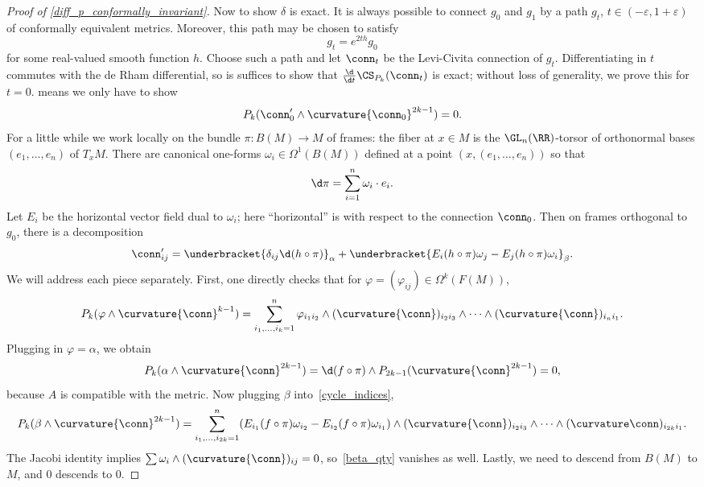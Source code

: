 \begin{proof}[Proof of \cref{diff_p_conformally_invariant}]
Now to show $\delta$ is exact. It is always possible to connect $g_0$ and $g_1$ by a path $g_t$,
$t\in(-\varepsilon, 1+\varepsilon)$ of conformally equivalent metrics. Moreover, this path may be chosen to satisfy
\[g_t = e^{2th}g_0\]
for some real-valued smooth function $h$. Choose such a path and let $\conn_t$ be the Levi-Civita connection of
$g_t$.  Differentiating in $t$ commutes with the de Rham differential, so is suffices to show that $\frac{\d}{\d
t}\CS_{P_k}(\conn_t)$ is exact; without loss of generality, we prove this for $t = 0$.
 means we only have to show
\begin{equation}
	P_k(\conn_0'\wedge \curvature{\conn_0}^{2k-1}) = 0.
\end{equation}
For a little while we work locally on the bundle $\pi\colon B(M)\to M$ of frames: the fiber at $x\in M$ is the
$\GL_n(\RR)$-torsor of orthonormal bases $(e_1, \dotsc, e_n)$ of $T_xM$. There are canonical one-forms
$\omega_i\in\Omega^1(B(M))$ defined at a point $(x, (e_1, \dotsc, e_n))$ so that
\begin{equation}
	\d\pi = \sum_{i=1}^n \omega_i \cdot e_i.
\end{equation}
Let $E_i$ be the horizontal vector field dual to $\omega_i$; here ``horizontal'' is with respect to the connection
$\conn_0$. Then on frames orthogonal to $g_0$, there is a decomposition \cite[Lemma 4.4]{cs}
\begin{equation}
	\conn_{ij}' = \underbracket{\delta_{ij}\d(h\circ\pi)}_{\alpha} + \underbracket{E_i(h\circ\pi)\omega_j -
	E_j(h\circ\pi)\omega_i}_{\beta}.
\end{equation}
We will address each piece separately. First, one directly checks that for $\varphi =
(\varphi_{ij})\in\Omega^k(F(M))$,
\begin{equation}
\label{cycle_indices}
	P_k(\varphi\wedge \curvature{\conn}^{k-1}) = \sum_{i_1,\dotsc,i_k = 1}^n
	\varphi_{i_1i_2}\wedge (\curvature{\conn})_{i_2i_3}\wedge\dotsb\wedge (\curvature{\conn})_{i_ni_1}.
\end{equation}
Plugging in $\varphi = \alpha$, we obtain
\begin{equation}
	P_k(\alpha\wedge \curvature{\conn}^{2k-1}) = \d(f\circ\pi)\wedge P_{2k-1}(\curvature{\conn}^{2k-1}) = 0,
\end{equation}
because $A$ is compatible with the metric. Now plugging $\beta$ into~\eqref{cycle_indices},
\begin{equation}
\label{beta_qty}
	P_k(\beta\wedge\curvature{\conn}^{2k-1}) = \sum_{i_1,\dotsc,i_{2k} = 1}^n
	(E_{i_1}(f\circ\pi)\omega_{i_2} - E_{i_2}(f\circ\pi)\omega_{i_1})\wedge(\curvature{\conn})_{i_2i_3}\wedge\dotsb\wedge
	(\curvature\conn)_{i_{2k}i_1}.
\end{equation}
The Jacobi identity implies $\sum \omega_i\wedge(\curvature{\conn})_{ij} = 0$, so~\eqref{beta_qty} vanishes as
well. Lastly, we need to descend from $B(M)$ to $M$, and $0$ descends to $0$.
\end{proof}

